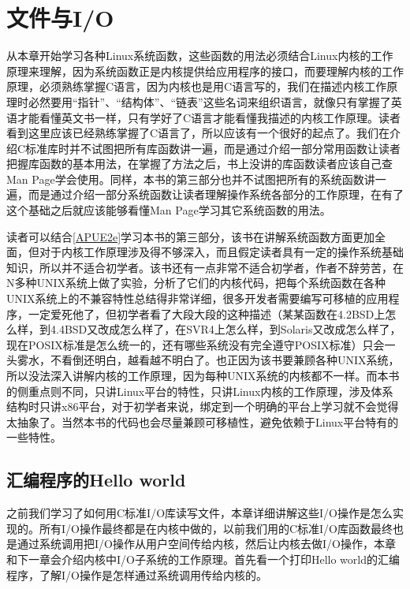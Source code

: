 

\chapter{文件与I/O}
%
从本章开始学习各种Linux系统函数，这些函数的用法必须结合Linux内核的工作原理来理解，因为系统函数正是内核提供给应用程序的接口，而要理解内核的工作原理，必须熟练掌握C语言，因为内核也是用C语言写的，我们在描述内核工作原理时必然要用“指针”、“结构体”、“链表”这些名词来组织语言，就像只有掌握了英语才能看懂英文书一样，只有学好了C语言才能看懂我描述的内核工作原理。读者看到这里应该已经熟练掌握了C语言了，所以应该有一个很好的起点了。我们在介绍C标准库时并不试图把所有库函数讲一遍，而是通过介绍一部分常用函数让读者把握库函数的基本用法，在掌握了方法之后，书上没讲的库函数读者应该自己查Man Page学会使用。同样，本书的第三部分也并不试图把所有的系统函数讲一遍，而是通过介绍一部分系统函数让读者理解操作系统各部分的工作原理，在有了这个基础之后就应该能够看懂Man Page学习其它系统函数的用法。



读者可以结合\hyperlink{db.bi01.bibli.apue}{[APUE2e]}学习本书的第三部分，该书在讲解系统函数方面更加全面，但对于内核工作原理涉及得不够深入，而且假定读者具有一定的操作系统基础知识，所以并不适合初学者。该书还有一点非常不适合初学者，作者不辞劳苦，在N多种UNIX系统上做了实验，分析了它们的内核代码，把每个系统函数在各种UNIX系统上的不兼容特性总结得非常详细，很多开发者需要编写可移植的应用程序，一定爱死他了，但初学者看了大段大段的这种描述（某某函数在4.\BookSplit{}2BSD上怎么样，到4.\BookSplit{}4BSD又改成怎么样了，在SVR4上怎么样，到Solaris又改成怎么样了，现在POSIX标准是怎么统一的，还有哪些系统没有完全遵守POSIX标准）只会一头雾水，不看倒还明白，越看越不明白了。也正因为该书要兼顾各种UNIX系统，所以没法深入讲解内核的工作原理，因为每种UNIX系统的内核都不一样。而本书的侧重点则不同，只讲Linux平台的特性，只讲Linux内核的工作原理，涉及体系结构时只讲x86平台，对于初学者来说，绑定到一个明确的平台上学习就不会觉得太抽象了。当然本书的代码也会尽量兼顾可移植性，避免依赖于Linux平台特有的一些特性。




\section{汇编程序的Hello world}
%
之前我们学习了如何用C标准I/\BookSplit{}O库读写文件，本章详细讲解这些I/\BookSplit{}O操作是怎么实现的。所有I/\BookSplit{}O操作最终都是在内核中做的，以前我们用的C标准I/\BookSplit{}O库函数最终也是通过系统调用把I/\BookSplit{}O操作从用户空间传给内核，然后让内核去做I/\BookSplit{}O操作，本章和下一章会介绍内核中I/\BookSplit{}O子系统的工作原理。首先看一个打印Hello world的汇编程序，了解I/\BookSplit{}O操作是怎样通过系统调用传给内核的。


